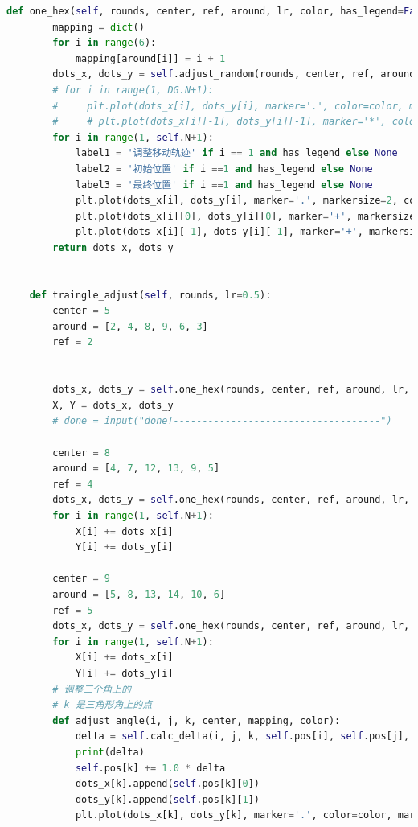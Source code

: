 \documentclass[withoutpreface,bwprint]{cumcmthesis} %
\begin{document}
\begin{appendices}
\begin{lstlisting}[language=python]
    def one_hex(self, rounds, center, ref, around, lr, color, has_legend=False):
        mapping = dict()
        for i in range(6):
            mapping[around[i]] = i + 1
        dots_x, dots_y = self.adjust_random(rounds, center, ref, around, mapping, lr)
        # for i in range(1, DG.N+1):
        #     plt.plot(dots_x[i], dots_y[i], marker='.', color=color, markersize=0.5)
        #     # plt.plot(dots_x[i][-1], dots_y[i][-1], marker='*', color='cyan')
        for i in range(1, self.N+1):
            label1 = '调整移动轨迹' if i == 1 and has_legend else None 
            label2 = '初始位置' if i ==1 and has_legend else None
            label3 = '最终位置' if i ==1 and has_legend else None
            plt.plot(dots_x[i], dots_y[i], marker='.', markersize=2, color='blue', label=label1)
            plt.plot(dots_x[i][0], dots_y[i][0], marker='+', markersize=7, color='orange', label=label2)
            plt.plot(dots_x[i][-1], dots_y[i][-1], marker='+', markersize=10, color='cyan', label=label3)
        return dots_x, dots_y
    
        
    def traingle_adjust(self, rounds, lr=0.5):
        center = 5
        around = [2, 4, 8, 9, 6, 3]
        ref = 2
        
        
        dots_x, dots_y = self.one_hex(rounds, center, ref, around, lr, color='blue')
        X, Y = dots_x, dots_y
        # done = input("done!------------------------------------")
        
        center = 8
        around = [4, 7, 12, 13, 9, 5]
        ref = 4
        dots_x, dots_y = self.one_hex(rounds, center, ref, around, lr, color='green')
        for i in range(1, self.N+1):
            X[i] += dots_x[i]
            Y[i] += dots_y[i]
        
        center = 9
        around = [5, 8, 13, 14, 10, 6]
        ref = 5
        dots_x, dots_y = self.one_hex(rounds, center, ref, around, lr, color='purple', has_legend=True)
        for i in range(1, self.N+1):
            X[i] += dots_x[i]
            Y[i] += dots_y[i]
        # 调整三个角上的
        # k 是三角形角上的点
        def adjust_angle(i, j, k, center, mapping, color):
            delta = self.calc_delta(i, j, k, self.pos[i], self.pos[j], ref0=self.pos[center], mapping=mapping, debug=True)
            print(delta)
            self.pos[k] += 1.0 * delta
            dots_x[k].append(self.pos[k][0])
            dots_y[k].append(self.pos[k][1])
            plt.plot(dots_x[k], dots_y[k], marker='.', color=color, markersize=0.5)
        

\end{lstlisting}
\end{appendices}
\end{document}
